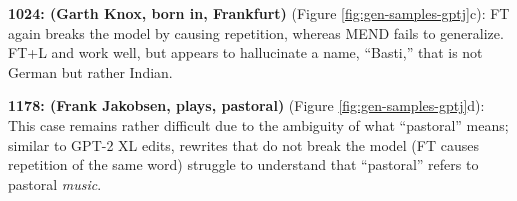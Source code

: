\noindent\textbf{1024: (Garth Knox, born in, Frankfurt)} (Figure \ref{fig:gen-samples-gptj}c): FT again breaks the model by causing repetition, whereas MEND fails to generalize. FT+L and \method work well, but \method appears to hallucinate a name, ``Basti,'' that is not German but rather Indian.

\noindent\textbf{1178: (Frank Jakobsen, plays, pastoral)} (Figure \ref{fig:gen-samples-gptj}d): This case remains rather difficult due to the ambiguity of what ``pastoral'' means; similar to GPT-2 XL edits, rewrites that do not break the model (FT causes repetition of the same word) struggle to understand that ``pastoral'' refers to pastoral \textit{music}.